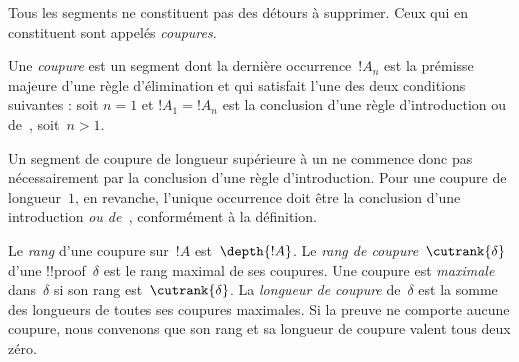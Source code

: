 \documentclass[../../../include/open-logic-section]{subfiles}
\begin{document}
Tous les segments ne constituent pas des détours à
supprimer. Ceux qui en constituent sont appelés
\emph{coupures}.

\begin{defn}
Une \emph{coupure} est un segment dont la dernière
occurrence~$!A_n$ est la prémisse majeure d'une règle
d'élimination et qui satisfait l'une des deux conditions
suivantes : soit $n=1$ et $!A_1 = !A_n$ est la
conclusion d'une règle d'introduction ou de~\FalseInt,
soit~$n>1$.
\end{defn}

Un segment de coupure de longueur supérieure à un
ne commence donc pas nécessairement par la conclusion
d'une règle d'introduction. Pour une coupure de
longueur~$1$, en revanche, l'unique occurrence doit
être la conclusion d'une introduction \emph{ou
de~\FalseInt}, conformément à la définition.

\begin{defn}
Le \emph{rang} d'une coupure sur~$!A$ est~$\depth{!A}$.
Le \emph{rang de coupure}~$\cutrank{\delta}$ d'une
!!{proof}~$\delta$ est le rang maximal de ses coupures.
Une coupure est \emph{maximale} dans~$\delta$ si son
rang est~$\cutrank{\delta}$.
La \emph{longueur de coupure} de~$\delta$ est la somme
des longueurs de toutes ses coupures maximales.
Si la preuve ne comporte aucune coupure, nous
convenons que son rang et sa longueur de coupure
valent tous deux zéro.
\end{defn}
\end{document}
